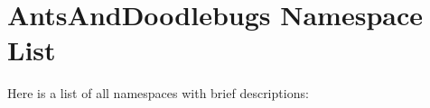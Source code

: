 \section{Ants\-And\-Doodlebugs Namespace List}
Here is a list of all namespaces with brief descriptions:\begin{CompactList}
\item{}
\end{CompactList}
